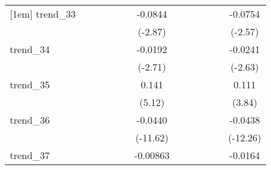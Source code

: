 {\begin{tabular}{l*{12}{c}}
[1em]
trend\_33    &                     &                     &                     &                     &                     &     -0.0844\sym{**} &                     &                     &                     &                     &                     &     -0.0754\sym{*}  \\
            &                     &                     &                     &                     &                     &     (-2.87)         &                     &                     &                     &                     &                     &     (-2.57)         \\
[1em]
trend\_34    &                     &                     &                     &                     &                     &     -0.0192\sym{**} &                     &                     &                     &                     &                     &     -0.0241\sym{*}  \\
            &                     &                     &                     &                     &                     &     (-2.71)         &                     &                     &                     &                     &                     &     (-2.63)         \\
[1em]
trend\_35    &                     &                     &                     &                     &                     &       0.141\sym{***}&                     &                     &                     &                     &                     &       0.111\sym{***}\\
            &                     &                     &                     &                     &                     &      (5.12)         &                     &                     &                     &                     &                     &      (3.84)         \\
[1em]
trend\_36    &                     &                     &                     &                     &                     &     -0.0440\sym{***}&                     &                     &                     &                     &                     &     -0.0438\sym{***}\\
            &                     &                     &                     &                     &                     &    (-11.62)         &                     &                     &                     &                     &                     &    (-12.26)         \\
[1em]
trend\_37    &                     &                     &                     &                     &                     &    -0.00863         &                     &                     &                     &                     &                     &     -0.0164         \\

\end{tabular}}
